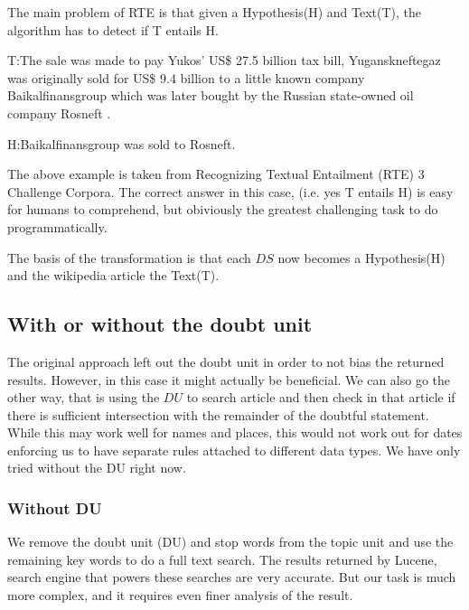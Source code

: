 \documentclass[11pt]{article}
\begin{document}
The main problem of RTE is that given a Hypothesis(H) and Text(T), the algorithm has to detect if T entails H.

T:The sale was made to pay Yukos' US\$ 27.5 billion tax bill, Yuganskneftegaz was originally sold for US\$ 9.4 billion to a little known company Baikalfinansgroup which was later bought by the Russian state-owned oil company Rosneft .

H:Baikalfinansgroup was sold to Rosneft.

The above example is taken from Recognizing Textual Entailment (RTE) 3 Challenge Corpora. The correct answer in this case, (i.e. yes T entails H) is easy for humans to comprehend, but obiviously the greatest challenging task to do programmatically.

The basis of the transformation is that each $DS$ now becomes a Hypothesis(H) and the wikipedia article the Text(T). 

\subsection{With or without the doubt unit}

The original approach left out the doubt unit in order to not bias the returned results. However, in this case it might actually be beneficial. We can also go the other way, that is using the $DU$ to search article and then check in that article if there is sufficient intersection with the remainder of the doubtful statement. While this may work well for names and places, this would not work out for dates enforcing us to have separate rules attached to different data types. We have only tried without the DU right now.

\subsubsection{Without DU}
We remove the doubt unit (DU) and stop words from the topic unit and use the remaining key words to do a full text search. The results returned by Lucene, search engine that powers these searches are very accurate. But our task is much more complex, and it requires even finer analysis of the result. 
\end{document}
